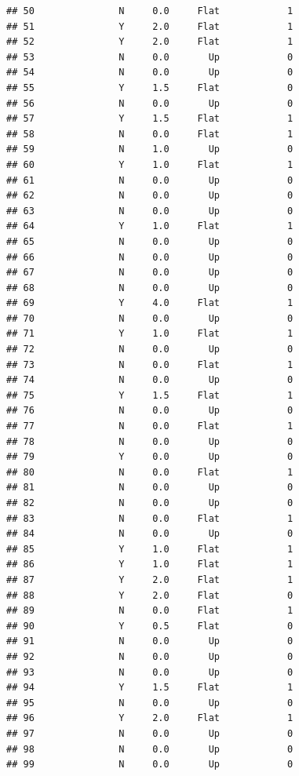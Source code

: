 \documentclass[
]{article}
\begin{document}
\begin{verbatim}
## 50               N     0.0     Flat            1
## 51               Y     2.0     Flat            1
## 52               Y     2.0     Flat            1
## 53               N     0.0       Up            0
## 54               N     0.0       Up            0
## 55               Y     1.5     Flat            0
## 56               N     0.0       Up            0
## 57               Y     1.5     Flat            1
## 58               N     0.0     Flat            1
## 59               N     1.0       Up            0
## 60               Y     1.0     Flat            1
## 61               N     0.0       Up            0
## 62               N     0.0       Up            0
## 63               N     0.0       Up            0
## 64               Y     1.0     Flat            1
## 65               N     0.0       Up            0
## 66               N     0.0       Up            0
## 67               N     0.0       Up            0
## 68               N     0.0       Up            0
## 69               Y     4.0     Flat            1
## 70               N     0.0       Up            0
## 71               Y     1.0     Flat            1
## 72               N     0.0       Up            0
## 73               N     0.0     Flat            1
## 74               N     0.0       Up            0
## 75               Y     1.5     Flat            1
## 76               N     0.0       Up            0
## 77               N     0.0     Flat            1
## 78               N     0.0       Up            0
## 79               Y     0.0       Up            0
## 80               N     0.0     Flat            1
## 81               N     0.0       Up            0
## 82               N     0.0       Up            0
## 83               N     0.0     Flat            1
## 84               N     0.0       Up            0
## 85               Y     1.0     Flat            1
## 86               Y     1.0     Flat            1
## 87               Y     2.0     Flat            1
## 88               Y     2.0     Flat            0
## 89               N     0.0     Flat            1
## 90               Y     0.5     Flat            0
## 91               N     0.0       Up            0
## 92               N     0.0       Up            0
## 93               N     0.0       Up            0
## 94               Y     1.5     Flat            1
## 95               N     0.0       Up            0
## 96               Y     2.0     Flat            1
## 97               N     0.0       Up            0
## 98               N     0.0       Up            0
## 99               N     0.0       Up            0

\end{verbatim}
\end{document}
